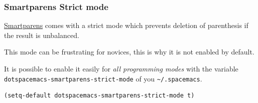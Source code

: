 \documentclass[11pt]{article}
\begin{document}
\subsubsection{Smartparens Strict mode}
\label{sec:org5465ff0}
\href{https://github.com/Fuco1/smartparens}{Smartparens} comes with a strict mode which prevents deletion of parenthesis if
the result is unbalanced.

This mode can be frustrating for novices, this is why it is not enabled by
default.

It is possible to enable it easily for \emph{all programming modes} with the variable
\texttt{dotspacemacs-smartparens-strict-mode} of you \texttt{\textasciitilde{}/.spacemacs}.

\begin{verbatim}
(setq-default dotspacemacs-smartparens-strict-mode t)
\end{verbatim}
\end{document}
